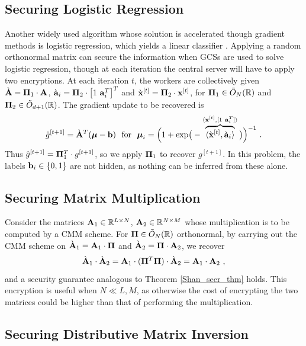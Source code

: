 \documentclass[journal,letterpaper,onecolumn,twoside,nofonttune]{IEEEtran}
\newcommand{\Otil}{\tilde{O}}
\newcommand{\xb}{\bold{x}}
\newcommand{\xbg}{{\grave{\bold{x}}}}
\newcommand{\Pibold}{\bold{\Pi}}
\newcommand{\R}{\mathbb{R}}
\newcommand{\gh}{\hat{g}}
\newcommand{\Ab}{\bold{A}}
\newcommand{\Abg}{{\grave{\bold{A}}}}
\newcommand{\bb}{\bold{b}}
\newcommand{\ab}{\bold{a}}
\newcommand{\abg}{\grave{\bold{a}}}
\begin{document}
\subsection{Securing Logistic Regression}
\label{orth_Log_regr}

Another widely used algorithm whose solution is accelerated though gradient methods is logistic regression, which yields a linear classifier \cite{Mur12}. Applying a random orthonormal matrix can secure the information when GCSs are used to solve logistic regression, though at each iteration the central server will have to apply two encryptions. At each iteration $t$, the workers are collectively given $\Abg=\Pibold_1\cdot\Ab$, $\abg_i=\Pibold_2\cdot\big[1\ \ab_i^T\big]^T$ and $\xbg^{[t]}=\Pibold_2\cdot\xb^{[t]}$, for $\Pibold_1\in \Otil_N(\R)$ and $\Pibold_2\in \Otil_{d+1}(\R)$. The gradient update to be recovered is
$$ \gh^{[t+1]}=\Abg^T(\boldsymbol{\mu}-\bb) \ \text{ for } \ \boldsymbol{\mu}_i=\Big(1+\text{exp}\big(-\overbrace{\langle\xbg^{[t]},\abg_i\rangle}^{\langle\xb^{[t]},[1\ \ab_i^T]\rangle}\big)\Big)^{-1}\ . $$
Thus $\gh^{[t+1]}=\Pibold_1^T\cdot g^{[t+1]}$, so we apply $\Pibold_1$ to recover $g^{[t+1]}$. In this problem, the labels $\bb_i\in\{0,1\}$ are not hidden, as nothing can be inferred from these alone.

\subsection{Securing Matrix Multiplication}
\label{orth_CMM}

Consider the matrices $\Ab_1\in\R^{L\times N}$, $\Ab_2\in\R^{N\times M}$ whose multiplication is to be computed by a CMM scheme. For $\Pibold\in\Otil_N(\R)$ orthonormal, by carrying out the CMM scheme on $\Abg_1=\Ab_1\cdot\Pibold$ and $\Abg_2=\Pibold\cdot\Ab_2$, we recover
\begin{equation}
  \Abg_1\cdot\Abg_2 = \Ab_1\cdot(\Pibold^T\Pibold)\cdot\Abg_2 = \Ab_1\cdot\Ab_2\ ,
\end{equation}
and a security guarantee analogous to Theorem \ref{Shan_secr_thm} holds. This encryption is useful when $N\ll L,M$, as otherwise the cost of encrypting the two matrices could be higher than that of performing the multiplication.

\subsection{Securing Distributive Matrix Inversion}
\end{document}
